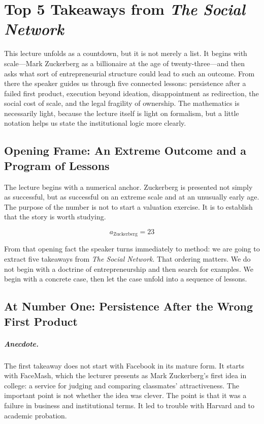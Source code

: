 \chapter{Top 5 Takeaways from \emph{The Social Network}}

This lecture unfolds as a countdown, but it is not merely a list. It begins with scale---Mark Zuckerberg as a billionaire at the age of twenty-three---and then asks what sort of entrepreneurial structure could lead to such an outcome. From there the speaker guides us through five connected lessons: persistence after a failed first product, execution beyond ideation, disappointment as redirection, the social cost of scale, and the legal fragility of ownership. The mathematics is necessarily light, because the lecture itself is light on formalism, but a little notation helps us state the institutional logic more clearly.

\section{Opening Frame: An Extreme Outcome and a Program of Lessons}

The lecture begins with a numerical anchor. Zuckerberg is presented not simply as successful, but as successful on an extreme scale and at an unusually early age. The purpose of the number is not to start a valuation exercise. It is to establish that the story is worth studying.

\begin{equation}
a_{\text{Zuckerberg}} = 23
\end{equation}

From that opening fact the speaker turns immediately to method: we are going to extract five takeaways from \emph{The Social Network}. That ordering matters. We do not begin with a doctrine of entrepreneurship and then search for examples. We begin with a concrete case, then let the case unfold into a sequence of lessons.

\section{At Number One: Persistence After the Wrong First Product}

\paragraph{Anecdote.}
The first takeaway does not start with Facebook in its mature form. It starts with FaceMash, which the lecturer presents as Mark Zuckerberg's first idea in college: a service for judging and comparing classmates' attractiveness. The important point is not whether the idea was clever. The point is that it was a failure in business and institutional terms. It led to trouble with Harvard and to academic probation.

